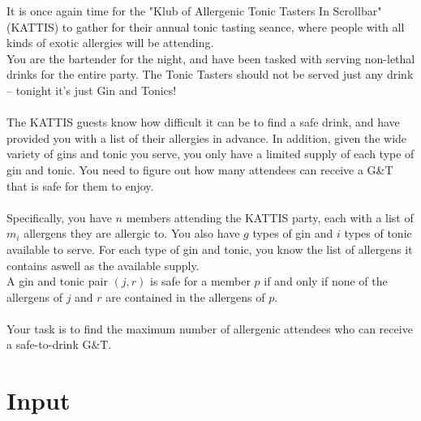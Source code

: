

\noindent It is once again time for the "Klub of Allergenic Tonic Tasters In Scrollbar" (KATTIS) to gather for their annual tonic tasting seance, where people with all kinds of exotic allergies will be attending.
\\
\noindent You are the bartender for the night, and have been tasked with serving non-lethal drinks for the entire party.
The Tonic Tasters should not be served just any drink -- tonight it's just Gin and Tonics!
\\\\
\noindent The KATTIS guests know how difficult it can be to find a safe drink, and have provided you with a list of their allergies in advance.
In addition, given the wide variety of gins and tonic you serve, you only have a limited supply of each type of gin and tonic.
You need to figure out how many attendees can receive a G\&T that is safe for them to enjoy.
\\\\
\noindent Specifically, you have $n$ members attending the KATTIS party, each with a list of $m_i$ allergens they are allergic to.
You also have $g$ types of gin and $i$ types of tonic available to serve.
For each type of gin and tonic, you know the list of allergens it contains aswell as the available supply.
\\

\noindent A gin and tonic pair $(j,r)$ is safe for a member $p$ if and only if none of the allergens of $j$ and $r$ are contained in the allergens of $p$.
\\\\
\noindent Your task is to find the maximum number of allergenic attendees who can receive a safe-to-drink G\&T.

\section*{Input}


